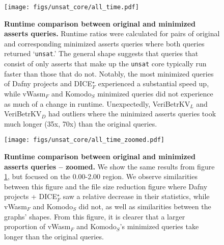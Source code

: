 \documentclass{article}
\newcommand{\unsat}{\texttt{unsat}\xspace}
\newcommand{\dlvbkv}{VeriBetrKV$_{L}$\xspace}
\newcommand{\dfvbkv}{VeriBetrKV$_{D}$\xspace}
\newcommand{\fsdice}{DICE$^\star_F$\xspace}
\newcommand{\fsvwasm}{vWasm$_F$\xspace}
\newcommand{\skomodo}{Komodo$_S$\xspace}
\begin{document}
\clearpage

\begin{figure}[H]
    \begin{minipage}[c]{\textwidth}
      \texttt{[image: figs/unsat\_core/all\_time.pdf]}
      \vspace{-0.5cm}
      \caption{\textbf{Runtime comparison between original and minimized asserts queries.} Runtime ratios were calculated for pairs of original and corresponding minimized asserts queries where both queries returned ‘\unsat.’ The general shape suggests that queries that consist of only asserts that make up the \unsat core typically run faster than those that do not. Notably, the most minimized queries of Dafny projects and \fsdice experienced a substantial speed up, while \fsvwasm and \skomodo minimized queries did not experience as much of a change in runtime. Unexpectedly, \dlvbkv and \dfvbkv had outliers where the minimized asserts queries took much longer (35x, 70x) than the original queries.}
      \label{fig:unsat_core_all_time}
      \vspace{0.5cm}
    \end{minipage}
\end{figure}

\clearpage

\begin{figure}[H]
    \begin{minipage}[c]{\textwidth}
      \texttt{[image: figs/unsat\_core/all\_time\_zoomed.pdf]}
      \vspace{-0.5cm}
      \caption{\textbf{Runtime comparison between original and minimized asserts queries -- zoomed.} We show the same results from figure \ref{fig:unsat_core_all_time}, but focused on the 0.00-2.00 region. We observe similarities between this figure and the file size reduction figure where Dafny projects + \fsdice saw a relative decrease in their statistics, while \fsvwasm and \skomodo did not, as well as similarities between the graphs' shapes. From this figure, it is clearer that a larger proportion of \fsvwasm and \skomodo's minimized queries take longer than the original queries.}
      \label{fig:unsat_core_all_time_zoomed}
      \vspace{0.5cm}
    \end{minipage}
\end{figure}

\clearpage
\end{document}
